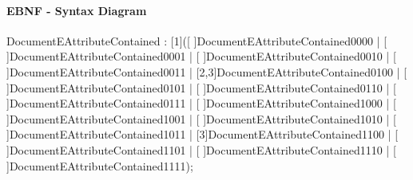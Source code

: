 \documentclass[11pt,a4paper]{article}
\begin{document}
\paragraph{EBNF - Syntax Diagram}
\begin{rail}
DocumentEAttributeContained : [1]([ ]DocumentEAttributeContained0000 | [ ]DocumentEAttributeContained0001 | [ ]DocumentEAttributeContained0010 | [ ]DocumentEAttributeContained0011 | [2,3]DocumentEAttributeContained0100 | [ ]DocumentEAttributeContained0101 | [ ]DocumentEAttributeContained0110 | [ ]DocumentEAttributeContained0111 | [ ]DocumentEAttributeContained1000 | [ ]DocumentEAttributeContained1001 | [ ]DocumentEAttributeContained1010 | [ ]DocumentEAttributeContained1011 | [3]DocumentEAttributeContained1100 | [ ]DocumentEAttributeContained1101 | [ ]DocumentEAttributeContained1110 | [ ]DocumentEAttributeContained1111);
\end{rail}
\end{document}
